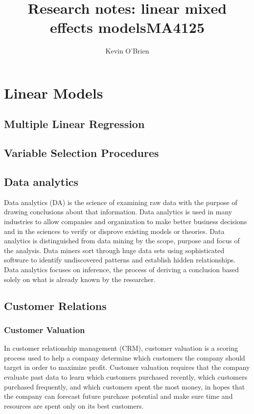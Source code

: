 \documentclass[12pt, a4paper]{report}
\title{Research notes: linear mixed effects models}
\author{ } \date{ }
\theoremstyle{plain}
\theoremstyle{definition}
\theoremstyle{remark}
\begin{document}
\author{Kevin O'Brien}
\title{MA4125}

\tableofcontents \setcounter{tocdepth}{2}







\chapter{Linear Models}
\section{Multiple Linear Regression}
\section{Variable Selection Procedures}
   

\section{Data analytics}
Data analytics (DA) is the science of examining raw data with the purpose of drawing conclusions about that information. Data analytics is used in many industries to allow companies and organization to make better business decisions and in the sciences to verify or disprove existing models or theories. Data analytics is distinguished from data mining by the scope, purpose and focus of the analysis. Data miners sort through huge data sets using sophisticated software to identify undiscovered patterns and establish hidden relationships. Data analytics focuses on inference, the process of deriving a conclusion based solely on what is already known by the researcher.




\section{Customer Relations}

\subsection{Customer Valuation}
In customer relationship management (CRM), customer valuation is a scoring process used to help a company determine which customers the company should target in order to maximize profit. Customer valuation requires that the company evaluate past data to learn which customers purchased recently, which customers purchased frequently, and which customers spent the most money, in hopes that the company can forecast future purchase potential and make sure time and resources are spent only on its best customers.
\end{document}
